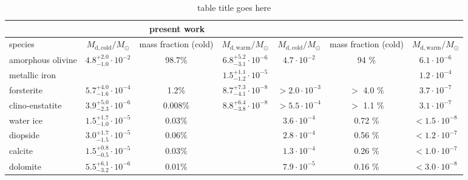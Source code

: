 \begin{table}
\caption{\label{tab:ngc6302} table title goes here}
  \begin{tabular}{l c c c c c c}
\hline %
\hline
                     & \multicolumn{3}{c}{present work}                                                       & \multicolumn{3}{c}{\citet{Kemper_02_mineral}} \\
\hline
species              & $ M_{\mathrm{d,cold}}/M_{\odot}$      & mass fraction (cold) & $ M_{\mathrm{d,warm}}/M_{\odot}$  & $ M_{\mathrm{d,cold}}/M_{\odot}$   & mass fraction (cold) & $ M_{\mathrm{d,warm}}/M_{\odot}$\\
\hline
amorphous olivine    & $4.8^{+2.0}_{-1.0} \cdot 10^{-2}$   & 98.7\%                & $6.8^{+5.2}_{-3.1} \cdot 10^{-6}$ & $4.7 \cdot 10^{-2}$           & 94 \%                & $6.1 \cdot 10^{-6}$ \\
metallic iron        &                                  &                       & $1.5^{+1.1}_{-1.2} \cdot 10^{-5}$ &                              &                      & $1.2 \cdot 10^{-4}$ \\
forsterite           & $5.7^{+4.0}_{-1.6} \cdot 10^{-4}$   & 1.2\%                 & $8.7^{+7.3}_{-4.1} \cdot 10^{-8}$ & $> 2.0 \cdot 10^{-3}$         & $>$ 4.0 \%           & $3.7 \cdot 10^{-7}$ \\
clino-enstatite      & $3.9^{+5.0}_{-2.3} \cdot 10^{-6}$   & 0.008\%               & $8.8^{+6.4}_{-3.8} \cdot 10^{-8}$ & $> 5.5 \cdot 10^{-4}$         & $>$ 1.1 \%           & $3.1 \cdot 10^{-7}$ \\
water ice            & $1.5^{+1.7}_{-1.0} \cdot 10^{-5}$   & 0.03\%                &                              & $3.6 \cdot 10^{-4}$           & 0.72 \%              & $< 1.5 \cdot 10^{-8}$\\
diopside             & $3.0^{+1.7}_{-1.5} \cdot 10^{-5}$   & 0.06\%                &                              & $2.8 \cdot 10^{-4}$           & 0.56 \%              & $< 1.2 \cdot 10^{-7}$\\
calcite              & $1.5^{+0.8}_{-0.5} \cdot 10^{-5}$   & 0.03\%                &                              & $1.3 \cdot 10^{-4}$           & 0.26 \%              & $< 1.0 \cdot 10^{-7}$\\
dolomite             & $5.5^{+6.1}_{-3.2} \cdot 10^{-6}$   & 0.01\%                &                              & $7.9 \cdot 10^{-5}$           & 0.16 \%              & $< 3.0 \cdot 10^{-8}$\\
\hline
\hline
\end{tabular}
\end{table}
